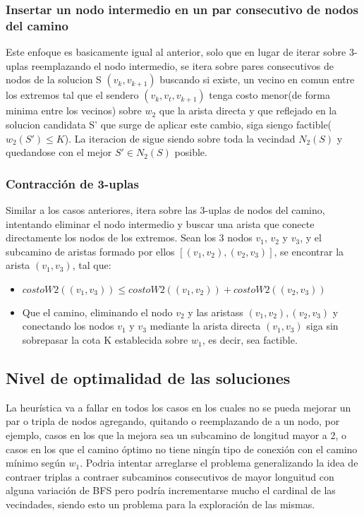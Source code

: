 \subsubsection{Insertar un nodo intermedio en un par consecutivo de nodos del camino}
Este enfoque es basicamente igual al anterior, solo que en lugar de iterar sobre 3-uplas reemplazando el nodo intermedio, se itera sobre pares consecutivos de nodos de la solucion S $(v_k, v_{k+1})$ buscando si existe, un vecino en comun entre los extremos tal que el sendero $(v_k, v_t, v_{k+1})$ tenga costo menor(de forma minima entre los vecinos) sobre $w_2$ que la arista directa y que reflejado en la solucion candidata S' que surge de aplicar este cambio, siga siengo factible($w_2(S') \leq K$). La iteracion de sigue siendo sobre toda la vecindad $N_2(S)$ y quedandose con el mejor $S' \in N_2(S)$ posible.


\subsubsection{Contracci\'on de 3-uplas}

Similar a los casos anteriores, itera sobre las 3-uplas de nodos del camino, intentando eliminar el nodo intermedio y buscar una arista que conecte directamente los nodos de los extremos. Sean los 3 nodos $v_1$, $v_2$ y $v_3$, y el subcamino de aristas formado por ellos $[ (v_1, v_2), (v_2, v_3)]$, se encontrar la arista $(v_1, v_3)$, tal que:

\begin{itemize}
	\item $costoW2((v_1, v_3)) \leq costoW2((v_1, v_2)) + costoW2((v_2, v_3))$
	\item Que el camino, eliminando el nodo $v_2$ y las aristass $(v_1, v_2), (v_2, v_3)$ y conectando los nodos $v_1$ y $v_3$ mediante la arista directa $(v_1, v_3)$ siga sin sobrepasar la cota K establecida sobre $w_1$, es decir, sea factible.
\end{itemize}

\subsection{Nivel de optimalidad de las soluciones}

La heur\'istica va a fallar en todos los casos en los cuales no se pueda mejorar un par o tripla de nodos agregando, quitando o reemplazando de a un nodo, por ejemplo, casos en los que la mejora sea un subcamino de longitud mayor a 2, o casos en los que el camino \'optimo no tiene ning\'in tipo de conexi\'on con el camino m\'inimo seg\'un $w_1$. Podria intentar arreglarse el problema generalizando la idea de contraer triplas a contraer subcaminos consecutivos de mayor longuitud con alguna variaci\'on de BFS pero podr\'ia incrementarse mucho el cardinal de las vecindades, siendo esto un problema para la exploraci\'on de las mismas.

